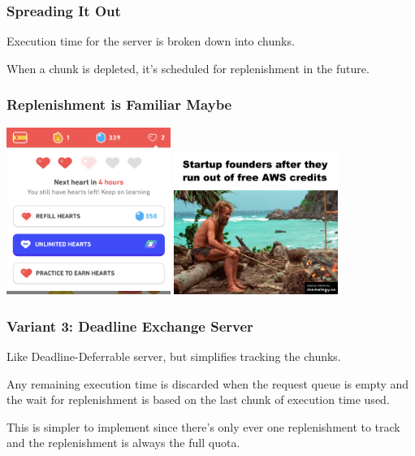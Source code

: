 \begin{frame}
\frametitle{Spreading It Out}

Execution time for the server is broken down into chunks.

When a chunk is depleted, it's scheduled for replenishment in the future.

\end{frame}

\begin{frame}
\frametitle{Replenishment is Familiar Maybe}

\begin{center}
	\includegraphics[width=0.4\textwidth]{images/duolingo-hearts.png}
	\includegraphics[width=0.4\textwidth]{images/aws.jpg}
\end{center}

\end{frame}

\begin{frame}
\frametitle{Variant 3: Deadline Exchange Server}
Like Deadline-Deferrable server, but simplifies tracking the chunks.

Any remaining execution time is discarded when the request queue is empty and the wait for replenishment is based on the last chunk of execution time used.

This is simpler to implement since there's only ever one replenishment to track and the replenishment is always the full quota. 

\end{frame}

